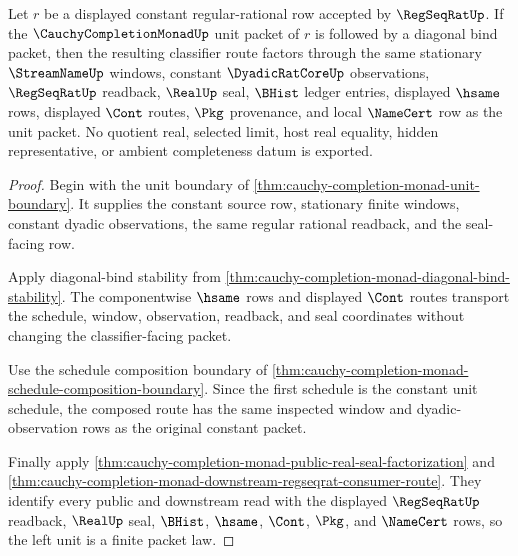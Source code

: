 \begin{theorem}
\label{thm:cauchy-completion-monad-left-unit-law}
Let $r$ be a displayed constant regular-rational row accepted by $\RegSeqRatUp$. If the $\CauchyCompletionMonadUp$ unit packet of $r$ is followed by a diagonal bind packet, then the resulting classifier route factors through the same stationary $\StreamNameUp$ windows, constant $\DyadicRatCoreUp$ observations, $\RegSeqRatUp$ readback, $\RealUp$ seal, $\BHist$ ledger entries, displayed $\hsame$ rows, displayed $\Cont$ routes, $\Pkg$ provenance, and local $\NameCert$ row as the unit packet. No quotient real, selected limit, host real equality, hidden representative, or ambient completeness datum is exported.
\end{theorem}
\begin{proof}
Begin with the unit boundary of \autoref{thm:cauchy-completion-monad-unit-boundary}. It supplies the constant source row, stationary finite windows, constant dyadic observations, the same regular rational readback, and the seal-facing row.

Apply diagonal-bind stability from \autoref{thm:cauchy-completion-monad-diagonal-bind-stability}. The componentwise $\hsame$ rows and displayed $\Cont$ routes transport the schedule, window, observation, readback, and seal coordinates without changing the classifier-facing packet.

Use the schedule composition boundary of \autoref{thm:cauchy-completion-monad-schedule-composition-boundary}. Since the first schedule is the constant unit schedule, the composed route has the same inspected window and dyadic-observation rows as the original constant packet.

Finally apply \autoref{thm:cauchy-completion-monad-public-real-seal-factorization} and \autoref{thm:cauchy-completion-monad-downstream-regseqrat-consumer-route}. They identify every public and downstream read with the displayed $\RegSeqRatUp$ readback, $\RealUp$ seal, $\BHist$, $\hsame$, $\Cont$, $\Pkg$, and $\NameCert$ rows, so the left unit is a finite packet law.
\end{proof}

